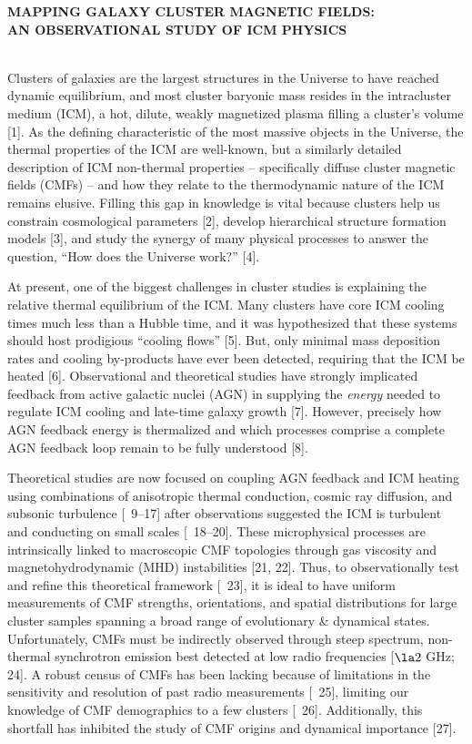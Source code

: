 \documentclass[12pt]{article}
\begin{document}
\doublespacing
\begin{center}
  {\bf\uppercase{mapping galaxy cluster magnetic fields:\\an
      observational study of icm physics}}
\end{center}

\\
\indent Clusters of galaxies are the largest structures in the
Universe to have reached dynamic equilibrium, and most cluster
baryonic mass resides in the intracluster medium (ICM), a hot, dilute,
weakly magnetized plasma filling a cluster's volume [1]. As the
defining characteristic of the most massive objects in the Universe,
the thermal properties of the ICM are well-known, but a similarly
detailed description of ICM non-thermal properties -- specifically
diffuse cluster magnetic fields (CMFs) -- and how they relate to the
thermodynamic nature of the ICM remains elusive. Filling this gap in
knowledge is vital because clusters help us constrain cosmological
parameters [2], develop hierarchical structure formation models [3],
and study the synergy of many physical processes to answer the
question, ``How does the Universe work?'' [4].

At present, one of the biggest challenges in cluster studies is
explaining the relative thermal equilibrium of the ICM. Many clusters
have core ICM cooling times much less than a Hubble time, and it was
hypothesized that these systems should host prodigious ``cooling
flows'' [5]. But, only minimal mass deposition rates and cooling
by-products have ever been detected, requiring that the ICM be heated
[6]. Observational and theoretical studies have strongly implicated
feedback from active galactic nuclei (AGN) in supplying the
{\it{energy}} needed to regulate ICM cooling and late-time galaxy
growth [7]. However, precisely how AGN feedback energy is thermalized
and which processes comprise a complete AGN feedback loop remain to be
fully understood [8].

Theoretical studies are now focused on coupling AGN feedback and ICM
heating using combinations of anisotropic thermal conduction, cosmic
ray diffusion, and subsonic turbulence [\eg\ 9--17] after observations
suggested the ICM is turbulent and conducting on small scales
[\eg\ 18--20]. These microphysical processes are intrinsically linked
to macroscopic CMF topologies through gas viscosity and
magnetohydrodynamic (MHD) instabilities [21, 22]. Thus, to
observationally test and refine this theoretical framework [\eg\ 23],
it is ideal to have uniform measurements of CMF strengths,
orientations, and spatial distributions for large cluster samples
spanning a broad range of evolutionary \& dynamical
states. Unfortunately, CMFs must be indirectly observed through steep
spectrum, non-thermal synchrotron emission best detected at low radio
frequencies [$\la 2$ GHz; 24]. A robust census of CMFs has been
lacking because of limitations in the sensitivity and resolution of
past radio measurements [\eg\ 25], limiting our knowledge of CMF
demographics to a few clusters [\eg\ 26]. Additionally, this shortfall
has inhibited the study of CMF origins and dynamical importance [27].
\end{document}

